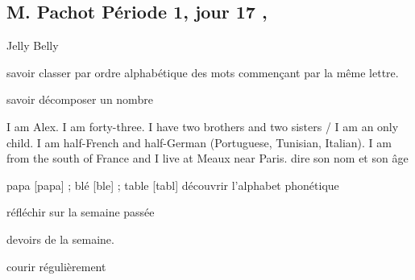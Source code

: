 \documentclass{article}
\begin{document}
\reversemarginpar
\setlength{\parskip}{2.8ex}
	
\subsection*{M. Pachot \hfill Période 1, jour 17 \hfill {} \sep}

\nte Jelly Belly


\dis\cfr{}
\obj savoir classer par ordre alphabétique des mots commençant par la même lettre.

\dis\cma{}
\obj savoir décomposer un nombre


\Dis\cen{} I am Alex. I am forty-three. I have two brothers and two sisters / I am an only child. I am half-French and half-German (Portuguese, Tunisian, Italian). I am from the south of France and I live at Meaux near Paris.
\obj dire son nom et son âge

\dis\cfr{}

\Dis\cfr{}
\Ard papa [papa] ; blé [ble] ; table [tabl]
\obj découvrir l’alphabet phonétique



\Dis\chg{}

\Dis\chg{}
\obj réfléchir sur la semaine passée


\dev devoirs de la semaine.

\Dis\csp{}
\obj courir régulièrement

\end{document}
